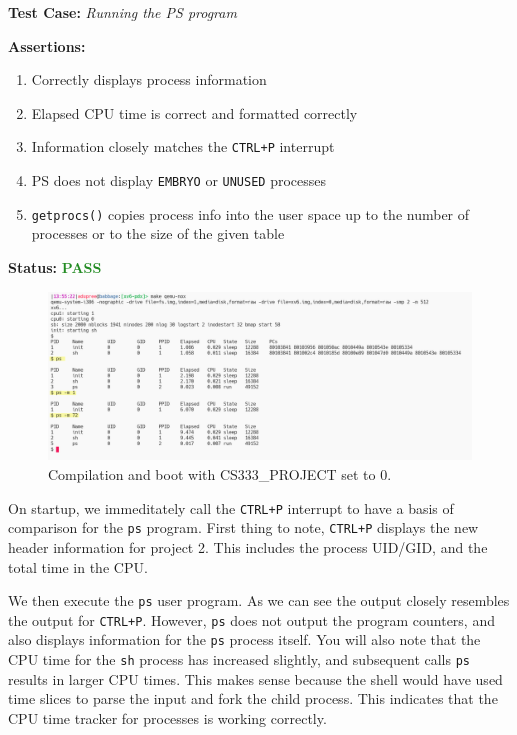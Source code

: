 \documentclass[11pt,letterpaper]{report}
\newcommand{\code}[1]{\colorbox{codegray}{\texttt{#1}}}
\begin{document}
{  \noindent\textbf{Test Case:} \emph{Running the PS program}
  
  \noindent\textbf{Assertions:}
  \begin{enumerate}[]
  \item Correctly displays process information
  \item Elapsed CPU time is correct and formatted correctly
  \item Information closely matches the \code{CTRL+P} interrupt
  \item PS does not display \code{EMBRYO} or \code{UNUSED} processes
  \item \code{getprocs()} copies process info into the user space up to the number of processes or to the size of the given table
  \end{enumerate}  
  
  \noindent\textbf{Status:} \textcolor{ForestGreen}{\textbf{PASS}}
  
  \begin{figure}[h!]
	\centering
	\includegraphics[width=1\linewidth]{ps-test.png}
	\caption[img]{Compilation and boot with CS333\_PROJECT set to 0.}
	\label{fig:P1compileP0-1}
  \end{figure}

  On startup, we immeditately call the \code{CTRL+P} interrupt to have a basis of comparison 
  for the \code{ps} program. First thing to note, \code{CTRL+P} displays the new header 
  information for project 2. This includes the process UID/GID, and the total time in the 
  CPU. 
  
  We then execute the \code{ps} user program. As we can see the output closely resembles the 
  output for \code{CTRL+P}. However, \code{ps} does not output the program counters, and also
  displays information for the \code{ps} process itself. You will also note that the CPU time
  for the \code{sh} process has increased slightly, and subsequent calls \code{ps} results in
  larger CPU times. This makes sense because the shell would have used time slices to 
  parse the input and fork the child process. This indicates that the CPU time tracker 
  for processes is working correctly. 

}
\end{document}
